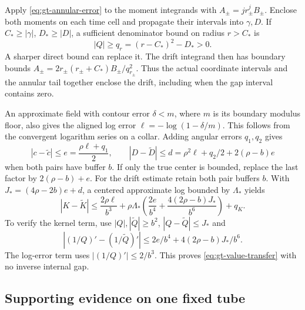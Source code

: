 Apply \eqref{eq:gt-annular-error} to the moment integrands with
\(A_\pm=j r_\pm^jB_\pm\). Enclose both moments on each time cell and
propagate their intervals into \(\gamma,D\). If \(C_*\ge|\gamma|\),
\(D_*\ge|D|\), a sufficient denominator bound on radius \(r>C_*\) is
\[
 |Q|\ge q_r=(r-C_*)^2-D_*>0.
\]
A sharper direct bound can replace it. The drift integrand then has
boundary bounds
\(A_\pm=2r_\pm(r_\pm+C_*)B_\pm/q_{r_\pm}^2\).
Thus the actual coordinate intervals and the annular tail together
enclose the drift, including when the gap interval contains zero.

An approximate field with contour error \(\delta<m\), where \(m\)
is its boundary modulus floor, also gives the aligned log error
\(\ell=-\log(1-\delta/m)\). This follows from the convergent logarithm
series on a collar. Adding angular errors \(q_1,q_2\) gives
\[
 |c-\widetilde c|\le e=\frac{\rho\ell+q_1}{2},\qquad
 |D-\widetilde D|\le d=\rho^2\ell+q_2/2+2(\rho-b)e
\]
when both pairs have buffer \(b\). If only the true center is bounded,
replace the last factor by \(2(\rho-b)+e\).
For the drift estimate retain both pair buffers \(b\). With
\(J_*=(4\rho-2b)e+d\), a centered approximate log bounded by
\(\Lambda_*\) yields
\begin{equation}
 |K-\widetilde K|\le
 \frac{2\rho\ell}{b^3}
 +\rho\Lambda_*\left(\frac{2e}{b^4}
       +\frac{4(2\rho-b)J_*}{b^6}\right)+q_K .
 \label{eq:gt-value-transfer}
\end{equation}
To verify the kernel term, use \(|Q|,|\widetilde Q|\ge b^2\),
\(|Q-\widetilde Q|\le J_*\) and
\[
 |(1/Q)'-(1/\widetilde Q)'|
 \le2e/b^4+4(2\rho-b)J_*/b^6.
\]
The log-error term uses \(|(1/Q)'|\le2/b^3\).
This proves \eqref{eq:gt-value-transfer} with no inverse internal gap.

\subsection{Supporting evidence on one fixed tube}

